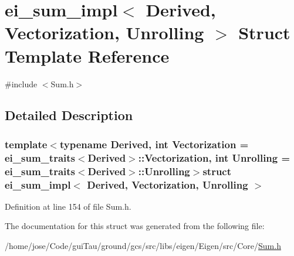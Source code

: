 \hypertarget{structei__sum__impl}{\section{ei\-\_\-sum\-\_\-impl$<$ Derived, Vectorization, Unrolling $>$ Struct Template Reference}
\label{structei__sum__impl}
}


{\ttfamily \#include $<$Sum.\-h$>$}



\subsection{Detailed Description}
\subsubsection*{template$<$typename Derived, int Vectorization = ei\-\_\-sum\-\_\-traits$<$\-Derived$>$\-::\-Vectorization, int Unrolling = ei\-\_\-sum\-\_\-traits$<$\-Derived$>$\-::\-Unrolling$>$struct ei\-\_\-sum\-\_\-impl$<$ Derived, Vectorization, Unrolling $>$}



Definition at line 154 of file Sum.\-h.



The documentation for this struct was generated from the following file\-:\begin{DoxyCompactItemize}
\item 
/home/jose/\-Code/gui\-Tau/ground/gcs/src/libs/eigen/\-Eigen/src/\-Core/\hyperlink{_sum_8h}{Sum.\-h}\end{DoxyCompactItemize}
